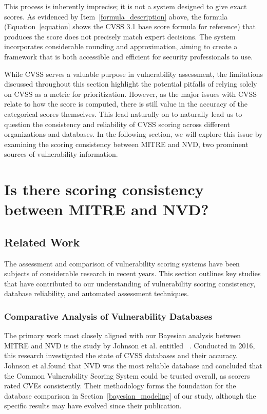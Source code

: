 \documentclass[12pt]{article}
\begin{document}
This process is inherently imprecise; it is not a system designed to give exact scores. As evidenced
by Item~\ref{formula_description} above, the formula (Equation~\ref{equation} shows the CVSS 3.1
base score formula for reference) that produces the score does not precisely match expert decisions.
The system incorporates considerable rounding and approximation, aiming to create a framework that
is both accessible and efficient for security professionals to use.

While CVSS serves a valuable purpose in vulnerability assessment, the limitations discussed
throughout this section highlight the potential pitfalls of relying solely on CVSS as a metric for
prioritization. However, as the major issues with CVSS relate to how the score is computed, there is
still value in the accuracy of the categorical scores themselves. This lead naturally on to
naturally lead us to question the consistency and reliability of CVSS scoring across different
organizations and databases. In the following section, we will explore this issue by examining the
scoring consistency between MITRE and NVD, two prominent sources of vulnerability information.

\section{Is there scoring consistency between MITRE and NVD?} \label{sec:scoring_consistency}

\subsection{Related Work}

The assessment and comparison of vulnerability scoring systems have been subjects of considerable
research in recent years. This section outlines key studies that have contributed to our
understanding of vulnerability scoring consistency, database reliability, and automated assessment
techniques.

\subsubsection{Comparative Analysis of Vulnerability Databases}

The primary work most closely aligned with our Bayesian analysis between MITRE and NVD is the study
by Johnson et al. entitled ~\cite{bayes}. Conducted in 2016, this research investigated the state of CVSS databases
and their accuracy. Johnson et al.\@ found that NVD was the most reliable database and concluded
that the Common Vulnerability Scoring System could be trusted overall, as scorers rated CVEs
consistently. Their methodology forms the foundation for the database comparison in
Section~\ref{bayesian_modeling} of our study, although the specific results may have evolved since
their publication.
\end{document}
